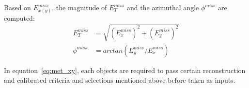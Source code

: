 \begin{table}[!htbp]
\begin{center}
  \end{center}
\end{table}

Based on $E_{x(y)}^{miss}$, the magnitude of $E_{T}^{miss}$ and the azimuthal angle $\phi^{miss}$ are computed:
\begin{equation}
\begin{split}
	E_{T}^{miss} &= \sqrt{ \left(E_{x}^{miss}\right)^{2} + \left(E_{y}^{miss}\right)^{2} } \\
	\phi^{miss} &= arctan \left(E_{y}^{miss}/E_{x}^{miss}\right)
\end{split}
\end{equation}

In equation~\ref{eq:met_xy}, each objects are required to pass certain reconstruction and calibrated criteria and selections mentioned above before taken as inputs.

